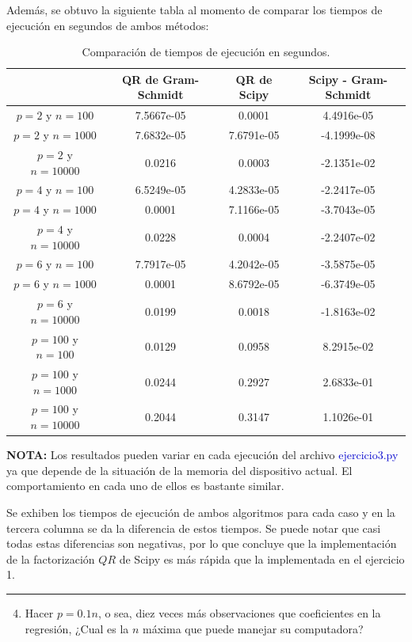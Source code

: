 Además, se obtuvo la siguiente tabla al momento de comparar los tiempos de ejecución en segundos de ambos métodos:

\begin{table}[h!]
	\centering
	\begin{tabular}{|c|c|c|c|}
		\hline
		          & QR de Gram-Schmidt  & QR de Scipy  & Scipy - Gram-Schmidt  \\ \hline
		$p=2$ y $n=100$  & 7.5667e-05  & 0.0001  & 4.4916e-05  \\ \hline
		$p=2$ y $n=1000$  & 7.6832e-05  & 7.6791e-05 & -4.1999e-08  \\ \hline
		$p=2$ y $n=10000$  & 0.0216  & 0.0003  & -2.1351e-02  \\ \hline
		$p=4$ y $n=100$ & 6.5249e-05  & 4.2833e-05  & -2.2417e-05  \\ \hline
		$p=4$ y $n=1000$  & 0.0001  & 7.1166e-05  & -3.7043e-05  \\ \hline
		$p=4$ y $n=10000$  & 0.0228  & 0.0004  & -2.2407e-02  \\ \hline
		$p=6$ y $n=100$  & 7.7917e-05  & 4.2042e-05  & -3.5875e-05  \\ \hline
		$p=6$ y $n=1000$  & 0.0001  & 8.6792e-05  & -6.3749e-05  \\ \hline
		$p=6$ y $n=10000$  & 0.0199 & 0.0018 & -1.8163e-02 \\ \hline
		$p=100$ y $n=100$  & 0.0129 & 0.0958 & 8.2915e-02 \\ \hline
		$p=100$ y $n=1000$  & 0.0244 & 0.2927 & 2.6833e-01 \\ \hline
		$p=100$ y $n=10000$  & 0.2044 & 0.3147 & 1.1026e-01 \\ \hline
	\end{tabular}
	\caption{Comparación de tiempos de ejecución en segundos.}
\end{table}

\textbf{NOTA:} Los resultados pueden variar en cada ejecución del archivo \textcolor{mediumblue}{ejercicio3.py} ya que depende de la situación de la memoria del dispositivo actual. El comportamiento en cada uno de ellos es bastante similar.

Se exhiben los tiempos de ejecución de ambos algoritmos para cada caso y en la tercera columna se da la diferencia de estos tiempos. Se puede notar que casi todas estas diferencias son negativas, por lo que concluye que la implementación de la factorización $QR$ de Scipy es más rápida que la implementada en el ejercicio 1.

\vspace{5mm}
{\color{lightgray} \hrule}
\begin{enumerate} \setcounter{enumi}{3}
	\item Hacer $p=0.1 n$, o sea, diez veces más observaciones que coeficientes en la regresión, ¿Cual es la $n$ máxima que puede manejar su computadora?
\end{enumerate}

